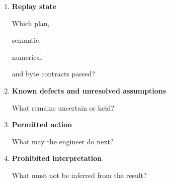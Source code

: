\documentclass[11pt,a4paper,oneside]{report}
\providecommand{\term}[1]{\textbf{#1}}
\begin{document}
\begin{enumerate}
Which relationships recur,

which are fragile

and which are replaceable?



\item

\term{Replay state}



Which plan,

semantic,

numerical

and byte contracts passed?



\item

\term{Known defects and unresolved assumptions}



What remains uncertain or held?



\item

\term{Permitted action}



What may the engineer do next?



\item

\term{Prohibited interpretation}



What must not be inferred from the result?



\end{enumerate}
\end{document}

